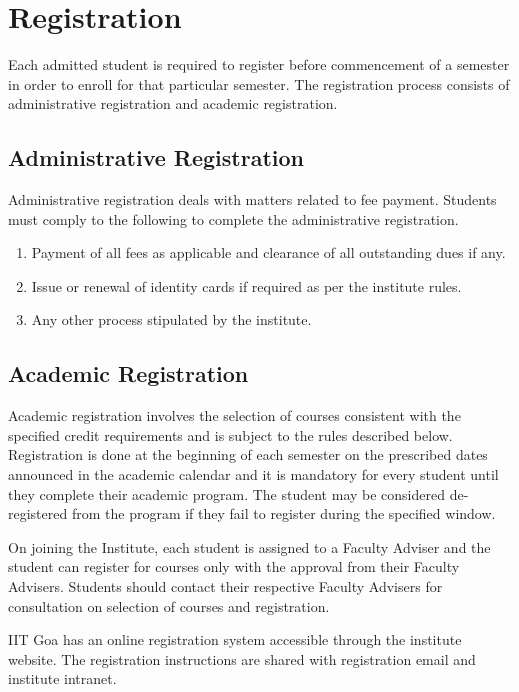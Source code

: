 \section{Registration }

Each admitted student is required to register before commencement of a semester in order to enroll for that particular semester. The registration process consists of administrative registration and academic registration.

\subsection{Administrative Registration}

Administrative registration deals with matters related to fee payment. Students must comply to the following to complete the administrative registration.

\begin{enumerate}
    \item Payment of all fees as applicable and clearance of all outstanding dues if any.
    \item Issue or renewal of identity cards if required as per the institute rules.
    \item Any other process stipulated by the institute.
\end{enumerate}

\subsection{Academic Registration}

Academic registration involves the selection of courses consistent with the specified credit requirements and is subject to the rules described below. Registration is done at the beginning of each semester on the prescribed dates announced in the academic calendar and it is mandatory for every student until they complete their academic program. The student may be considered de-registered from the program if they fail to register during the specified window.

On joining the Institute, each student is assigned to a Faculty Adviser and the student can register for courses only with the approval from their Faculty Advisers. Students should contact their respective Faculty Advisers for consultation on selection of courses and registration.

IIT Goa has an online registration system accessible through the institute website. The registration instructions are shared with registration email and institute intranet.

